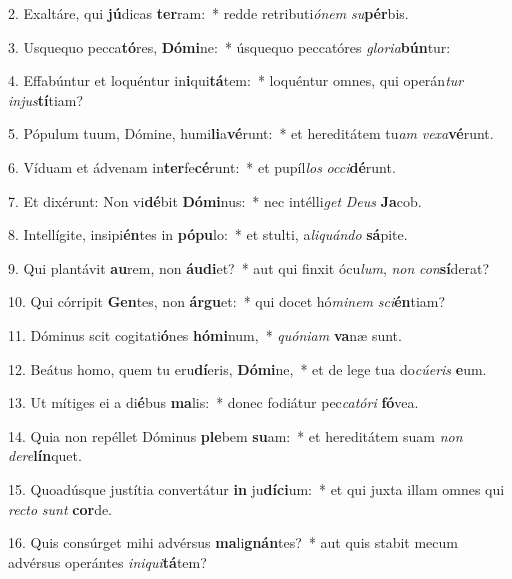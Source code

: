 2. Exaltáre, qui \textbf{jú}dicas \textbf{ter}ram:~*  redde retributi\textit{ó}\textit{nem} \textit{su}\textbf{pér}bis.\

3. Usquequo pecca\textbf{tó}res, \textbf{Dó}\textbf{mi}ne:~*  úsquequo peccatóres \textit{glo}\textit{ri}\textit{a}\textbf{bún}tur:\

4. Effabúntur et loquéntur in\textbf{i}qui\textbf{tá}tem:~*  loquéntur omnes, qui operán\textit{tur} \textit{in}\textit{jus}\textbf{tí}tiam?\

5. Pópulum tuum, Dómine, humi\textbf{li}a\textbf{vé}runt:~*  et hereditátem tu\textit{am} \textit{ve}\textit{xa}\textbf{vé}runt.\

6. Víduam et ádvenam in\textbf{ter}fe\textbf{cé}runt:~*  et pupíl\textit{los} \textit{oc}\textit{ci}\textbf{dé}runt.\

7. Et dixérunt: Non vi\textbf{dé}bit \textbf{Dó}\textbf{mi}nus:~*  nec intélli\textit{get} \textit{De}\textit{us} \textbf{Ja}cob.\

8. Intellígite, insipi\textbf{én}tes in \textbf{pó}\textbf{pu}lo:~*  et stulti, a\textit{li}\textit{quán}\textit{do} \textbf{sá}pite.\

9. Qui plantávit \textbf{au}rem, non \textbf{áu}\textbf{di}et?~*  aut qui finxit ócu\textit{lum}, \textit{non} \textit{con}\textbf{sí}derat?\

10. Qui córripit \textbf{Gen}tes, non \textbf{ár}\textbf{gu}et:~*  qui docet hó\textit{mi}\textit{nem} \textit{sci}\textbf{én}tiam?\

11. Dóminus scit cogitati\textbf{ó}nes \textbf{hó}\textbf{mi}num,~*  \textit{quón}\textit{i}\textit{am} \textbf{va}næ sunt.\

12. Beátus homo, quem tu eru\textbf{dí}eris, \textbf{Dó}\textbf{mi}ne,~*  et de lege tua do\textit{cú}\textit{e}\textit{ris} \textbf{e}um.\

13. Ut mítiges ei a di\textbf{é}bus \textbf{ma}lis:~*  donec fodiátur pec\textit{ca}\textit{tó}\textit{ri} \textbf{fó}vea.\

14. Quia non repéllet Dóminus \textbf{ple}bem \textbf{su}am:~*  et hereditátem suam \textit{non} \textit{de}\textit{re}\textbf{lín}quet.\

15. Quoadúsque justítia convertátur \textbf{in} ju\textbf{dí}\textbf{ci}um:~*  et qui juxta illam omnes qui \textit{rec}\textit{to} \textit{sunt} \textbf{cor}de.\

16. Quis consúrget mihi advérsus \textbf{ma}li\textbf{gnán}tes?~*  aut quis stabit mecum advérsus operántes \textit{in}\textit{i}\textit{qui}\textbf{tá}tem?\

